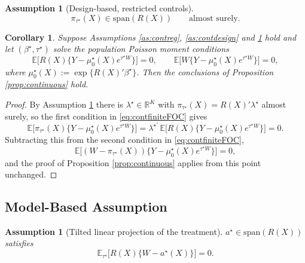 \documentclass[11pt]{article}
\newtheorem{corollary}[theorem]{Corollary}
\newtheorem{assumption}{Assumption}
\newtheorem{assumptionprime}{Assumption}
\theoremstyle{definition}
\theoremstyle{plain}
\newcommand{\E}{\mathbb{E}}
\newcommand{\1}{\mathbf{1}}
\newcommand{\R}{\mathbb{R}}
\begin{document}
\begin{assumptionprime}[Design-based, restricted controls]
\label{as:contdesignspan}
\begin{equation}
\pi_{\tau^\star}(X)\in\mathrm{span}(R(X))
\qquad\text{almost surely.}
\label{eq:contspancondition}
\end{equation}
\end{assumptionprime}

\begin{corollary}
\label{cor:contfinite}
Suppose Assumptions \ref{as:contreg}, \ref{as:contdesign} and \ref{as:contdesignspan} hold and let $(\beta^\star,\tau^\star)$ solve the population Poisson moment conditions
\begin{equation}
\E\Big[R(X)\bigl\{Y-\mu_0^\star(X)e^{\tau^\star W}\bigr\}\Big]=0,
\qquad
\E\Big[W\bigl\{Y-\mu_0^\star(X)e^{\tau^\star W}\bigr\}\Big]=0,
\label{eq:contfiniteFOC}
\end{equation}
where $\mu_0^\star(X):=\exp\{R(X)'\beta^\star\}$.  Then the conclusions of Proposition \ref{prop:continuous} hold.
\end{corollary}

\begin{proof}
By Assumption \ref{as:contdesignspan} there is $\lambda^\star\in\R^K$ with $\pi_{\tau^\star}(X)=R(X)'\lambda^\star$ almost surely, so the first condition in \eqref{eq:contfiniteFOC} gives
\[
\E\Big[\pi_{\tau^\star}(X)\bigl\{Y-\mu_0^\star(X)e^{\tau^\star W}\bigr\}\Big]
=\lambda^{\star\prime}\,\E\Big[R(X)\bigl\{Y-\mu_0^\star(X)e^{\tau^\star W}\bigr\}\Big]=0 .
\]
Subtracting this from the second condition in \eqref{eq:contfiniteFOC},
\[
\E\Big[(W-\pi_{\tau^\star}(X))\bigl\{Y-\mu_0^\star(X)e^{\tau^\star W}\bigr\}\Big]=0 ,
\]
and the proof of Proposition \ref{prop:continuous} applies from this point unchanged.
\end{proof}

\subsection{Model-Based Assumption}

\begin{assumption}[Tilted linear projection of the treatment]
\label{as:conttiltproj}
$a^\star\in\mathrm{span}(R(X))$ satisfies
\begin{equation}
\E_{\tau^\star}\Big[R(X)\bigl\{W-a^\star(X)\bigr\}\Big]=0 .
\label{eq:conttiltedprojection}
\end{equation}
\end{assumption}
\end{document}
